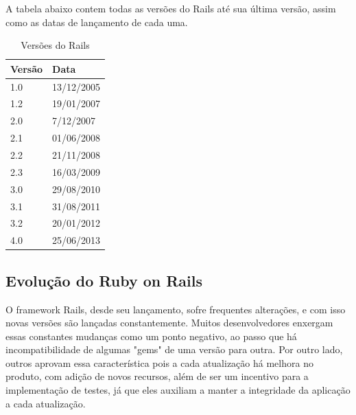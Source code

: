 A tabela abaixo contem todas as versões do Rails até sua última versão, assim como as datas de lançamento de cada uma.

\begin{table}[H]
\begin{center}
    \begin{tabular}{ | l | l |}
    \hline
    Versão & Data \\ \hline
    1.0 & 13/12/2005 \\ \hline
    1.2 & 19/01/2007 \\ \hline
    2.0 & 7/12/2007 \\ \hline
    2.1 & 01/06/2008 \\ \hline
    2.2 & 21/11/2008 \\ \hline
    2.3 & 16/03/2009 \\ \hline
    3.0 & 29/08/2010 \\ \hline
    3.1 & 31/08/2011 \\ \hline
    3.2 & 20/01/2012 \\ \hline
    4.0 & 25/06/2013 \\ \hline
    \end{tabular}
    \caption{Versões do Rails}
    \label{rails_versions}
\end{center}
\end{table}


\subsection{Evolução do Ruby on Rails}

O framework Rails, desde seu lançamento, sofre frequentes alterações, e com isso novas versões são lançadas constantemente. Muitos desenvolvedores enxergam essas constantes mudanças como um ponto negativo, ao passo que há incompatibilidade de algumas "gems" de uma versão para outra. Por outro lado, outros aprovam essa característica pois a cada atualização há melhora no produto, com adição de novos recursos, além de ser um incentivo para a implementação de testes, já que eles auxiliam a manter a integridade da aplicação a cada atualização.


